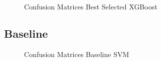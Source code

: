 \begin{figure}[!h]
\centering
  \caption{Confusion Matrices Best Selected XGBoost}
  \label{fig:base_best_xgb}
\end{figure}












\FloatBarrier
\subsection{Baseline}

\begin{figure}[!ht]
\centering
  \caption{Confusion Matrices Baseline SVM}
  \label{fig:base_line_svm}
\end{figure}


